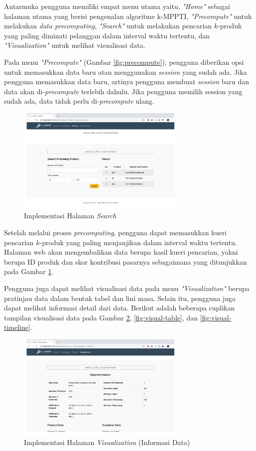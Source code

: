 Antarmuka pengguna memiliki empat menu utama yaitu, \textit{"Home"} sebagai halaman utama yang berisi pengenalan algoritme k-MPPTI, \textit{"Precompute"} untuk melakukan \textit{data precomputing}, \textit{"Search"} untuk melakukan pencarian $k$-produk yang paling diminati pelanggan dalam interval waktu tertentu, dan \textit{"Visualization"} untuk melihat visualisasi data.

Pada menu \textit{"Precompute"} (Gambar \ref{fig:precompute}), pengguna diberikan opsi untuk memasukkan data baru atau menggunakan \textit{session} yang sudah ada. Jika pengguna memasukkan data baru, artinya pengguna membuat \textit{session} baru dan data akan di-\textit{precompute} terlebih dahulu. Jika pengguna memilih session yang sudah ada, data tidak perlu di-\textit{precompute} ulang.

\begin{figure}[H]
	\centering
	\includegraphics[width=8cm]{assets/img/bab4/search.png}
	\caption{Implementasi Halaman \textit{Search}}
	\label{fig:search}
\end{figure}

Setelah melalui proses \textit{precomputing}, pengguna dapat memasukkan kueri pencarian $k$-produk yang paling menjanjikan dalam interval waktu tertentu. Halaman web akan mengembalikan data berupa hasil kueri pencarian, yakni berupa ID produk dan skor kontribusi pasarnya sebagaimana yang ditunjukkan pada Gambar \ref{fig:search}.

Pengguna juga dapat melihat visualisasi data pada menu \textit{"Visualization"} berupa pratinjau data dalam bentuk tabel dan lini masa. Selain itu, pengguna juga dapat melihat informasi detail dari data. Berikut adalah beberapa cuplikan tampilan visualisasi data pada Gambar \ref{fig:visual-data-info}, \ref{fig:visual-table}, dan \ref{fig:visual-timeline}.

\begin{figure}[H]
	\centering
	\includegraphics[width=8cm]{assets/img/bab4/data-info.png}
	\caption{Implementasi Halaman \textit{Visualization} (Informasi Data)}
	\label{fig:visual-data-info}
\end{figure}

